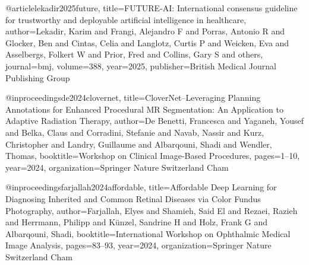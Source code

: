 






@article{lekadir2025future,
  title={FUTURE-AI: International consensus guideline for trustworthy and deployable artificial intelligence in healthcare},
  author={Lekadir, Karim and Frangi, Alejandro F and Porras, Antonio R and Glocker, Ben and Cintas, Celia and Langlotz, Curtis P and Weicken, Eva and Asselbergs, Folkert W and Prior, Fred and Collins, Gary S and others},
  journal={bmj},
  volume={388},
  year={2025},
  publisher={British Medical Journal Publishing Group}
}

@inproceedings{de2024clovernet,
  title={CloverNet--Leveraging Planning Annotations for Enhanced Procedural MR Segmentation: An Application to Adaptive Radiation Therapy},
  author={De Benetti, Francesca and Yaganeh, Yousef and Belka, Claus and Corradini, Stefanie and Navab, Nassir and Kurz, Christopher and Landry, Guillaume and Albarqouni, Shadi and Wendler, Thomas},
  booktitle={Workshop on Clinical Image-Based Procedures},
  pages={1--10},
  year={2024},
  organization={Springer Nature Switzerland Cham}
}

@inproceedings{farjallah2024affordable,
  title={Affordable Deep Learning for Diagnosing Inherited and Common Retinal Diseases via Color Fundus Photography},
  author={Farjallah, Elyes and Shamieh, Said El and Rezaei, Razieh and Herrmann, Philipp and K{\"u}nzel, Sandrine H and Holz, Frank G and Albarqouni, Shadi},
  booktitle={International Workshop on Ophthalmic Medical Image Analysis},
  pages={83--93},
  year={2024},
  organization={Springer Nature Switzerland Cham}
}